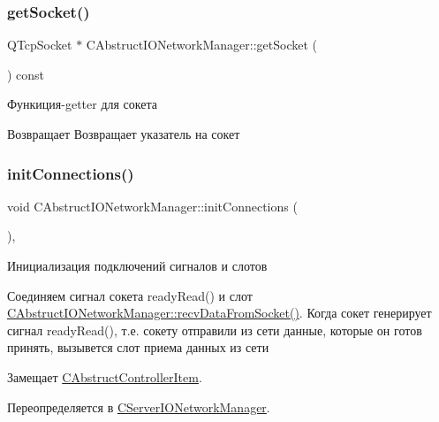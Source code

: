 \subsubsection{\texorpdfstring{get\+Socket()}{getSocket()}}
{\footnotesize\ttfamily Q\+Tcp\+Socket $\ast$ C\+Abstruct\+I\+O\+Network\+Manager\+::get\+Socket (\begin{DoxyParamCaption}{ }\end{DoxyParamCaption}) const}



Функиция-\/getter для сокета 

\begin{DoxyReturn}{Возвращает}
Возвращает указатель на сокет 
\end{DoxyReturn}
\hypertarget{class_c_abstruct_i_o_network_manager_ac01bfefacfa37050c8d3a9317a38fbf5}{}\label{class_c_abstruct_i_o_network_manager_ac01bfefacfa37050c8d3a9317a38fbf5} 
\subsubsection{\texorpdfstring{init\+Connections()}{initConnections()}}
{\footnotesize\ttfamily void C\+Abstruct\+I\+O\+Network\+Manager\+::init\+Connections (\begin{DoxyParamCaption}{ }\end{DoxyParamCaption})\hspace{0.3cm}{\ttfamily [protected]}, {\ttfamily [virtual]}}



Инициализация подключений сигналов и слотов 

Соединяем сигнал сокета ready\+Read() и слот \hyperlink{class_c_abstruct_i_o_network_manager_a78756fc08ed619162da210a9cfc09208}{C\+Abstruct\+I\+O\+Network\+Manager\+::recv\+Data\+From\+Socket()}.  Когда сокет генерирует сигнал ready\+Read(), т.\+е. сокету отправили из сети данные, которые он готов принять, вызывется слот приема данных из сети

Замещает \hyperlink{class_c_abstruct_controller_item_a27c6889230a86cb0782e6d7596b883c1}{C\+Abstruct\+Controller\+Item}.



Переопределяется в \hyperlink{class_c_server_i_o_network_manager_a17155570c51dc951db52d827f120c689}{C\+Server\+I\+O\+Network\+Manager}.

